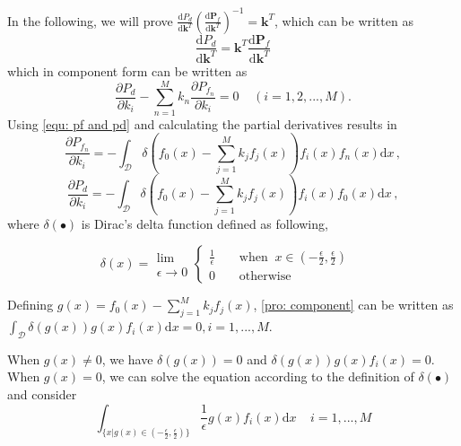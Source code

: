 In the following, we will prove $ \frac{\mathrm{d}P_d}{\mathrm{d}\mathbf{k}^T}(
\frac{\mathrm{d}\mathbf{P}_f}{\mathrm{d}\mathbf{k}^T}
)^{-1} = \mathbf{k}^T
$, which can be written as
\begin{equation}
\label{pro: vec}
\frac{\mathrm{d}P_d}{\mathrm{d}\mathbf{k}^T} = \mathbf{k}^T \frac{\mathrm{d}\mathbf{P}_f}{\mathrm{d}\mathbf{k}^T}
\end{equation}
which in component form can be written as 
\begin{equation}
\label{pro: component}
\frac{\partial P_d}{\partial k_i} - \sum_{n=1}^{M}k_n\frac{\partial P_{f_n}}{\partial k_i} = 0 \;\;\;\;(i=1, 2, ..., M).
\end{equation}
Using \eqref{equ: pf and pd} and calculating the  partial derivatives results in
\begin{equation}
\label{pro: Pf par k}
\frac{\partial P_{f_n}}{ \partial k_i} = - \int_{\mathcal{D}}\delta (f_0(x) - \sum_{j=1}^{M}k_jf_j(x))f_i(x)f_n(x) \mathrm{d}x\,,
\end{equation}
\label{pro: Pd par k}
\begin{equation}\frac{\partial P_d}{ \partial k_i} = - \int_{\mathcal{D}}\delta (f_0(x) - \sum_{j=1}^{M}k_jf_j(x))f_i(x)f_0(x) \mathrm{d}x\,,
\end{equation}
where $\delta(\bullet)$ is Dirac's delta function defined as following,

\begin{equation}
\label{pro: delta}
\delta(x) = \substack{\lim \\ \epsilon \rightarrow 0} \begin{cases}
\frac{1}{\epsilon}\;\;\;\;&\text{when} \;\;x \in (-\frac{\epsilon}{2}, \frac{\epsilon}{2})\\
0\;\;\;\;&\text{otherwise}
\end{cases} \;\;\;\;
\end{equation}

Defining $g(x) = f_0(x) - \sum_{j=1}^{M} k_jf_j(x)$, \eqref{pro: component} can be written as $\int_{\mathcal{D}}\delta(g(x))g(x)f_i(x)\mathrm{d}x = 0, i = 1, ..., M$.

When $g(x) \neq 0$, we have $\delta(g(x)) = 0$ and $\delta(g(x))g(x)f_i(x) = 0$.   When  $g(x) = 0$, we can solve the equation according to the definition of $\delta(\bullet)$ and consider
\begin{equation}
\label{pro: important}
\int_{\{x|g(x)\in (-\frac{\epsilon}{2}, \frac{\epsilon}{2})\}} \frac{1}{\epsilon} g(x)f_i(x) \mathrm{d}x\;\;\;\;i= 1, ..., M
\end{equation}

